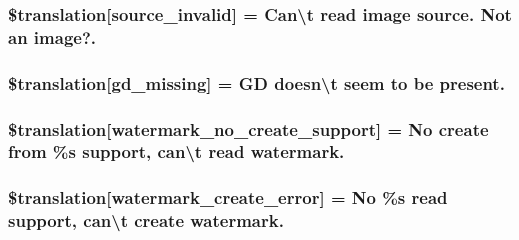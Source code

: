 \subsubsection[{\$translation}]{\setlength{\rightskip}{0pt plus 5cm}\$translation\mbox{[}\textquotesingle{}source\+\_\+invalid\textquotesingle{}\mbox{]} = \textquotesingle{}Can\textbackslash{}\textquotesingle{}t read image source. Not an image?.\textquotesingle{}}\label{class_8upload_8xx___x_x_8php_a6ab0a660b457eaf2d3434b225449fdd6}
\hypertarget{class_8upload_8xx___x_x_8php_a7f3dfcc0db4bbc0f2e7210c439798e56}{}
\subsubsection[{\$translation}]{\setlength{\rightskip}{0pt plus 5cm}\$translation\mbox{[}\textquotesingle{}gd\+\_\+missing\textquotesingle{}\mbox{]} = \textquotesingle{}G\+D doesn\textbackslash{}\textquotesingle{}t seem to be present.\textquotesingle{}}\label{class_8upload_8xx___x_x_8php_a7f3dfcc0db4bbc0f2e7210c439798e56}
\hypertarget{class_8upload_8xx___x_x_8php_a82d5853430ab72dc1f9799ec36144cc6}{}
\subsubsection[{\$translation}]{\setlength{\rightskip}{0pt plus 5cm}\$translation\mbox{[}\textquotesingle{}watermark\+\_\+no\+\_\+create\+\_\+support\textquotesingle{}\mbox{]} = \textquotesingle{}No create from \%s support, can\textbackslash{}\textquotesingle{}t read watermark.\textquotesingle{}}\label{class_8upload_8xx___x_x_8php_a82d5853430ab72dc1f9799ec36144cc6}
\hypertarget{class_8upload_8xx___x_x_8php_aabca0b65dadbc6184415c16375f284ca}{}
\subsubsection[{\$translation}]{\setlength{\rightskip}{0pt plus 5cm}\$translation\mbox{[}\textquotesingle{}watermark\+\_\+create\+\_\+error\textquotesingle{}\mbox{]} = \textquotesingle{}No \%s read support, can\textbackslash{}\textquotesingle{}t create watermark.\textquotesingle{}}\label{class_8upload_8xx___x_x_8php_aabca0b65dadbc6184415c16375f284ca}
\hypertarget{class_8upload_8xx___x_x_8php_ac336e7a5701e47ba4a05e9e498a3cc44}{}
